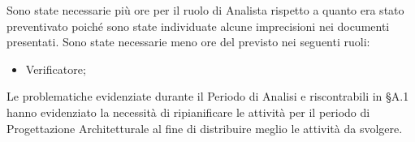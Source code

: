 Sono state necessarie più ore per il ruolo di Analista rispetto a quanto era stato preventivato poiché sono state individuate alcune imprecisioni nei documenti presentati.
\newline
Sono state necessarie meno ore del previsto nei seguenti ruoli:
\begin{itemize}
	\item Verificatore;
\end{itemize}
Le problematiche evidenziate durante il Periodo di Analisi e riscontrabili in §A.1 hanno evidenziato la necessità di ripianificare le attività per il periodo di Progettazione Architetturale al fine di distribuire meglio le attività da svolgere. 
